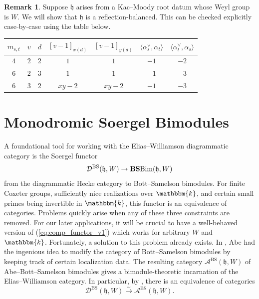 \documentclass{amsart}
\renewcommand{\k}{\mathbbm{k}}
\newcommand{\scrA}{\mathcal{A}}
\newcommand{\fr}[1]{\mathfrak{#1}}
\DeclareMathOperator{\BS}{BS}
\newcommand{\EW}{\mathcal{D}}
\newcommand{\BSBim}{\textbf{BS}\textnormal{Bim}}
\theoremstyle{definition}
\newtheorem{remark}[subsubsection]{Remark}
\numberwithin{equation}{subsection}
\begin{document}
\begin{remark}\label{rem:crystallographic_balancedness}
    Suppose $\fr{h}$ arises from a Kac--Moody root datum whose Weyl group is $W$. We will show that $\fr{h}$ is a reflection-balanced.
    This can be checked explicitly case-by-case using the table below.
    \begin{center}
        \begin{tabular}{c | c | c | c | c | c | c }
            $m_{s,t}$ & $v$ & $d$ & $[v-1]_{x(d)}$ & $[v-1]_{y(d)}$ & $\langle \alpha_s^{\vee}, \alpha_t \rangle$ &  $\langle \alpha_t^{\vee}, \alpha_s \rangle$ \\
            \hline
            $4$ & $2$ & $2$ & $1$ & $1$ & $-1$ & $-2$ \\
            $6$ & $2$ & $3$ & $1$ & $1$ & $-1$ & $-3$ \\
            $6$ & $3$ & $2$ & $xy-2$ & $xy-2$ & $-1$ & $-3$ 
        \end{tabular}
    \end{center}
\end{remark}

    \section{Monodromic Soergel Bimodules}\label{sec:abe}

A foundational tool for working with the Elias--Williamson diagrammatic category is the Soergel functor
\begin{equation}\label{eq:comp_functor_v1}
    \EW^{\BS} (\fr{h}, W) \to \BSBim(\fr{h}, W)
\end{equation}
from the diagrammatic Hecke category to Bott--Samelson bimodules.
For finite Coxeter groups, sufficiently nice realizations over $\k$, and certain small primes being invertible in $\k$, this functor is an equivalence of categories.
Problems quickly arise when any of these three constraints are removed. For our later applications, it will be crucial to have a well-behaved version of (\ref{eq:comp_functor_v1}) which works for arbitrary $W$ and $\k$.
Fortunately, a solution to this problem already exists. In \cite{Abe19}, Abe had the ingenious idea to modify the category of Bott--Samelson bimodules by keeping track of certain localization data.
The resulting category $\scrA^{\BS} (\fr{h}, W)$ of Abe--Bott--Samelson bimodules gives a bimodule-theoretic incarnation of the Elias--Williamson category. In particular, by \cite{Abe19}, there is an equivalence of categories
\begin{equation}\label{eq:comp_functor_v2}
    \EW^{\BS} (\fr{h}, W) \stackrel{\sim}{\to} \scrA^{\BS} (\fr{h}, W).
\end{equation}
\end{document}
